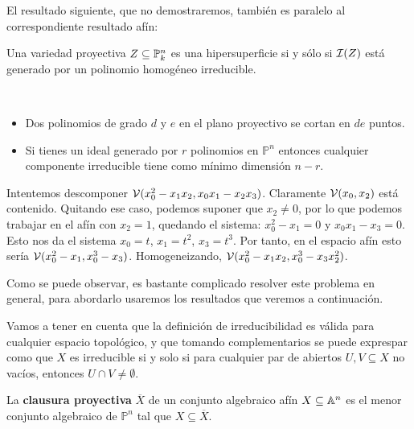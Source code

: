 \documentclass[ACGA.tex]{subfiles}
\begin{document}
El resultado siguiente, que no demostraremos, también es paralelo al correspondiente resultado afín:

\begin{prop}\label{principalproy}
 Una variedad proyectiva $Z\subseteq\mathbb{P}^n_k$ es una hipersuperficie si y sólo si $\mathcal{I}(Z)$ está generado por un polinomio homogéneo irreducible. 
\end{prop}

\begin{nota}\
\begin{itemize}


\item Dos polinomios de grado $d$ y $e$ en el plano proyectivo se cortan en $de$ puntos.

\item Si tienes un ideal generado por $r$ polinomios en $\mathbb{P}^n$ entonces cualquier componente irreducible tiene como mínimo dimensión $n-r$.
\end{itemize}
\end{nota}

\begin{ejer}
Intentemos descomponer $\mathcal{V}(x_0^2-x_1x_2,x_0x_1-x_2x_3)$. Claramente $\mathcal{V}(x_0,x_2)$ está contenido. Quitando ese caso, podemos suponer que $x_2\neq 0$, por lo que podemos trabajar en el afín con $x_2=1$, quedando el sistema: $x_0^2-x_1=0$ y $x_0x_1-x_3=0$. Esto nos da el sistema $x_0 = t$, $x_1=t^2$, $x_3=t^3$. Por tanto, en el espacio afín esto sería $\mathcal{V}(x_0^2-x_1,x_0^3-x_3)$. Homogeneizando, $\mathcal{V}(x_0^2-x_1x_2,x_0^3-x_3x_2^2)$. 

Como se puede observar, es bastante complicado resolver este problema en general, para abordarlo usaremos los resultados que veremos a continuación.

 
\end{ejer}

Vamos a tener en cuenta que la definición de irreducibilidad es válida para cualquier espacio topológico, y que tomando complementarios se puede exprespar como que $X$ es irreducible si y solo si para cualquier par de abiertos $U,V\subseteq X$ no vacíos, entonces $U\cap V\neq\emptyset$.

\begin{defi}
La \textbf{clausura proyectiva} $\overline{X}$ de un conjunto algebraico afín $X\subseteq\mathbb{A}^n$ es el menor conjunto algebraico de $\mathbb{P}^n$ tal que $X\subseteq\overline{X}$.
\end{defi}
\end{document}
